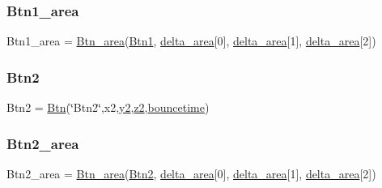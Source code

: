 \subsubsection{\texorpdfstring{Btn1\+\_\+area}{Btn1\_area}}
{\footnotesize\ttfamily Btn1\+\_\+area = \hyperlink{classRET__config_1_1Btn__area}{Btn\+\_\+area}(\hyperlink{namespaceRET__config_af037c6b9ff0314103d8127acc9d07e0b}{Btn1}, \hyperlink{namespaceRET__config_abbf3fd8fafae6a457e57109bfaf9a6c5}{delta\+\_\+area}\mbox{[}0\mbox{]}, \hyperlink{namespaceRET__config_abbf3fd8fafae6a457e57109bfaf9a6c5}{delta\+\_\+area}\mbox{[}1\mbox{]}, \hyperlink{namespaceRET__config_abbf3fd8fafae6a457e57109bfaf9a6c5}{delta\+\_\+area}\mbox{[}2\mbox{]})}

\mbox{\label{namespaceRET__config_a73afa8c52cebd94e1889df5fbe3bec66}} 
\subsubsection{\texorpdfstring{Btn2}{Btn2}}
{\footnotesize\ttfamily Btn2 = \hyperlink{classRET__config_1_1Btn}{Btn}(\char`\"{}Btn2\char`\"{},x2,\hyperlink{namespaceRET__config_a07bcd014e69eddcf4243b2a961014eaf}{y2},\hyperlink{namespaceRET__config_a55196b87940893e540ba636218f4eb07}{z2},\hyperlink{namespaceRET__config_a6c0865cd5d0010294697d27a2e89069d}{bouncetime})}

\mbox{\label{namespaceRET__config_a51a4083768cbc17b22a98ad63a7bf851}} 
\subsubsection{\texorpdfstring{Btn2\+\_\+area}{Btn2\_area}}
{\footnotesize\ttfamily Btn2\+\_\+area = \hyperlink{classRET__config_1_1Btn__area}{Btn\+\_\+area}(\hyperlink{namespaceRET__config_a73afa8c52cebd94e1889df5fbe3bec66}{Btn2}, \hyperlink{namespaceRET__config_abbf3fd8fafae6a457e57109bfaf9a6c5}{delta\+\_\+area}\mbox{[}0\mbox{]}, \hyperlink{namespaceRET__config_abbf3fd8fafae6a457e57109bfaf9a6c5}{delta\+\_\+area}\mbox{[}1\mbox{]}, \hyperlink{namespaceRET__config_abbf3fd8fafae6a457e57109bfaf9a6c5}{delta\+\_\+area}\mbox{[}2\mbox{]})}

